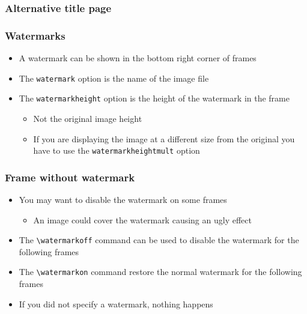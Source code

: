 \begin{frame}[t,fragile]
\frametitle{Alternative title page}
\end{frame}

\begin{frame}[t,fragile]
\frametitle{Watermarks}
\begin{itemize}
\item A watermark can be shown in the bottom right corner of frames
\item The \verb!watermark! option is the name of the image file
\item The \verb!watermarkheight! option is the height of the watermark in the frame
  \begin{itemize}
  \item Not the original image height
  \item If you are displaying the image at a different size from the original you
        have to use the \verb!watermarkheightmult! option
  \end{itemize}
\end{itemize}

\end{frame}

\watermarkoff
\begin{frame}[t,fragile]
\frametitle{Frame without watermark}

\begin{itemize}
\item You may want to disable the watermark on some frames
  \begin{itemize}
  \item An image could cover the watermark causing an ugly effect
  \end{itemize}
\item The \verb!\watermarkoff! command can be used to disable the watermark for the following frames
\item The \verb!\watermarkon! command restore the normal watermark for the following frames
\item If you did not specify a watermark, nothing happens
\end{itemize}

\end{frame}
\watermarkon


